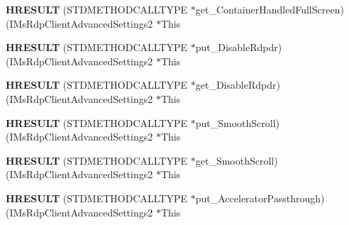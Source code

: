 \begin{DoxyCompactItemize}
\item 
\mbox{\label{struct_i_ms_rdp_client_advanced_settings2_vtbl_abc969a214458799238e4d38613ede81c}} 
{\bfseries H\+R\+E\+S\+U\+LT} (S\+T\+D\+M\+E\+T\+H\+O\+D\+C\+A\+L\+L\+T\+Y\+PE $\ast$get\+\_\+\+Container\+Handled\+Full\+Screen)(I\+Ms\+Rdp\+Client\+Advanced\+Settings2 $\ast$This
\item 
\mbox{\label{struct_i_ms_rdp_client_advanced_settings2_vtbl_a34dc75157fdbc6f74fa90530f4e9a36a}} 
{\bfseries H\+R\+E\+S\+U\+LT} (S\+T\+D\+M\+E\+T\+H\+O\+D\+C\+A\+L\+L\+T\+Y\+PE $\ast$put\+\_\+\+Disable\+Rdpdr)(I\+Ms\+Rdp\+Client\+Advanced\+Settings2 $\ast$This
\item 
\mbox{\label{struct_i_ms_rdp_client_advanced_settings2_vtbl_a439b31e1e69f910468c7deadbd416650}} 
{\bfseries H\+R\+E\+S\+U\+LT} (S\+T\+D\+M\+E\+T\+H\+O\+D\+C\+A\+L\+L\+T\+Y\+PE $\ast$get\+\_\+\+Disable\+Rdpdr)(I\+Ms\+Rdp\+Client\+Advanced\+Settings2 $\ast$This
\item 
\mbox{\label{struct_i_ms_rdp_client_advanced_settings2_vtbl_a6c9687e070167022612386d0cf1c39c0}} 
{\bfseries H\+R\+E\+S\+U\+LT} (S\+T\+D\+M\+E\+T\+H\+O\+D\+C\+A\+L\+L\+T\+Y\+PE $\ast$put\+\_\+\+Smooth\+Scroll)(I\+Ms\+Rdp\+Client\+Advanced\+Settings2 $\ast$This
\item 
\mbox{\label{struct_i_ms_rdp_client_advanced_settings2_vtbl_a55096e42eeac240ab41f1960d3765f64}} 
{\bfseries H\+R\+E\+S\+U\+LT} (S\+T\+D\+M\+E\+T\+H\+O\+D\+C\+A\+L\+L\+T\+Y\+PE $\ast$get\+\_\+\+Smooth\+Scroll)(I\+Ms\+Rdp\+Client\+Advanced\+Settings2 $\ast$This
\item 
\mbox{\label{struct_i_ms_rdp_client_advanced_settings2_vtbl_a6116e4b2627adb9b0fa87f8efb5332f0}} 
{\bfseries H\+R\+E\+S\+U\+LT} (S\+T\+D\+M\+E\+T\+H\+O\+D\+C\+A\+L\+L\+T\+Y\+PE $\ast$put\+\_\+\+Accelerator\+Passthrough)(I\+Ms\+Rdp\+Client\+Advanced\+Settings2 $\ast$This
\item 
\mbox{\label{struct_i_ms_rdp_client_advanced_settings2_vtbl_adef2b13e3a1d264f06d3dbfeba3d80b9}} 

\end{DoxyCompactItemize}
